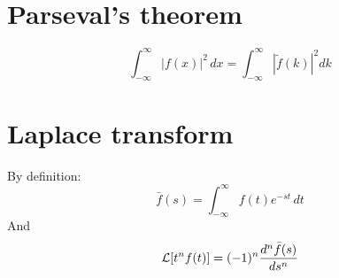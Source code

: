 \documentclass[12pt,twoside]{article}
\begin{document}
\section{Parseval's theorem}

\[
	\int_{-\infty}^{\infty} |f(x)|^2 \, dx = \int_{-\infty}^{\infty} |\tilde{f}(k)|^2 dk 
\]

\section{Laplace transform}
By definition:
\[
	\bar{f}(s) = \int_{-\infty}^{\infty} f(t) e^{-st} \, dt
\]
And
\[
	\ml{L} [t^n f(t)] = (-1)^n \frac{d^n \bar{f}(s)} {ds^n} %
\]
\end{document}
